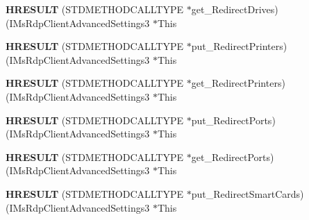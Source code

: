 \begin{DoxyCompactItemize}
\item 
\mbox{\label{struct_i_ms_rdp_client_advanced_settings3_vtbl_a264a7ee81d50464721eca34e61b09218}} 
{\bfseries H\+R\+E\+S\+U\+LT} (S\+T\+D\+M\+E\+T\+H\+O\+D\+C\+A\+L\+L\+T\+Y\+PE $\ast$get\+\_\+\+Redirect\+Drives)(I\+Ms\+Rdp\+Client\+Advanced\+Settings3 $\ast$This
\item 
\mbox{\label{struct_i_ms_rdp_client_advanced_settings3_vtbl_aa9906ac7320fff88d59ad11a3fa58445}} 
{\bfseries H\+R\+E\+S\+U\+LT} (S\+T\+D\+M\+E\+T\+H\+O\+D\+C\+A\+L\+L\+T\+Y\+PE $\ast$put\+\_\+\+Redirect\+Printers)(I\+Ms\+Rdp\+Client\+Advanced\+Settings3 $\ast$This
\item 
\mbox{\label{struct_i_ms_rdp_client_advanced_settings3_vtbl_a233ff60d57f4644e6297eae9e323f40d}} 
{\bfseries H\+R\+E\+S\+U\+LT} (S\+T\+D\+M\+E\+T\+H\+O\+D\+C\+A\+L\+L\+T\+Y\+PE $\ast$get\+\_\+\+Redirect\+Printers)(I\+Ms\+Rdp\+Client\+Advanced\+Settings3 $\ast$This
\item 
\mbox{\label{struct_i_ms_rdp_client_advanced_settings3_vtbl_ae2209091f092ab5436d88c6ebc6b3606}} 
{\bfseries H\+R\+E\+S\+U\+LT} (S\+T\+D\+M\+E\+T\+H\+O\+D\+C\+A\+L\+L\+T\+Y\+PE $\ast$put\+\_\+\+Redirect\+Ports)(I\+Ms\+Rdp\+Client\+Advanced\+Settings3 $\ast$This
\item 
\mbox{\label{struct_i_ms_rdp_client_advanced_settings3_vtbl_a8c9062b36c7fe6431d8ca312a5708f6a}} 
{\bfseries H\+R\+E\+S\+U\+LT} (S\+T\+D\+M\+E\+T\+H\+O\+D\+C\+A\+L\+L\+T\+Y\+PE $\ast$get\+\_\+\+Redirect\+Ports)(I\+Ms\+Rdp\+Client\+Advanced\+Settings3 $\ast$This
\item 
\mbox{\label{struct_i_ms_rdp_client_advanced_settings3_vtbl_a16eb48f07ba0c979e4285a2417e98c5c}} 
{\bfseries H\+R\+E\+S\+U\+LT} (S\+T\+D\+M\+E\+T\+H\+O\+D\+C\+A\+L\+L\+T\+Y\+PE $\ast$put\+\_\+\+Redirect\+Smart\+Cards)(I\+Ms\+Rdp\+Client\+Advanced\+Settings3 $\ast$This
\item 
\mbox{\label{struct_i_ms_rdp_client_advanced_settings3_vtbl_abe252ad33066bae9f9e7c035062a25ef}} 

\end{DoxyCompactItemize}
